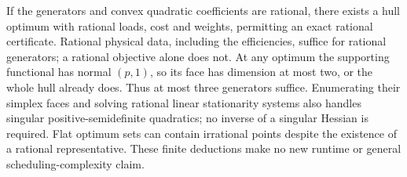 If the generators and convex quadratic coefficients are rational, there
exists a hull optimum with rational loads, cost and weights, permitting
an exact rational certificate. Rational physical data, including the
efficiencies, suffice for rational generators; a rational objective alone
does not. At any optimum the supporting functional has normal $(p,1)$,
so its face has dimension at most two, or the whole hull already does.
Thus at most three generators suffice. Enumerating their simplex faces
and solving rational linear stationarity systems also handles singular
positive-semidefinite quadratics; no inverse of a singular Hessian is
required. Flat optimum sets can contain irrational points despite the
existence of a rational representative. These finite deductions make no
new runtime or general scheduling-complexity claim.

